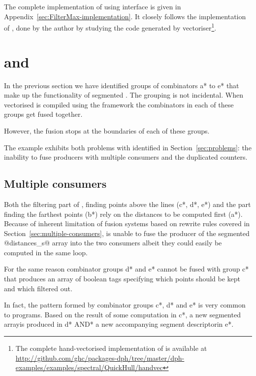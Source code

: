 \documentclass[preamble.tex]{subfiles}
\begin{document}
The complete implementation of  using \LiveFusion interface is given in Appendix~\ref{sec:FilterMax-implementation}. It closely follows the implementation of \QuickHull, done by the author by studying the  code generated by \DPH vectoriser\footnote{The complete hand-vectorised implementation of \QuickHull is available at \url{http://github.com/ghc/packages-dph/tree/master/dph-examples/examples/spectral/QuickHull/handvec}}.



\section{\StreamFusion and \FilterMax}

In the previous section we have identified groups of combinators \*a* to \*e* that make up the functionality of segmented \FilterMax. The grouping is not incidental. When vectorised \QuickHull is compiled using the \StreamFusion framework the combinators in each of these groups get fused together.

However, the fusion stops at the boundaries of each of these groups.

The \FilterMax example exhibits both problems with \StreamFusion identified in Section~\ref{sec:problems}: the inability to fuse producers with multiple consumers and the duplicated counters.


\subsection{Multiple consumers}

Both the filtering part of \FilterMax, finding points above the lines (\*c*, \*d*, \*e*) and the part finding the farthest points (\*b*) rely on the distances to be computed first (\*a*). Because of inherent limitation of fusion systems based on rewrite rules covered in Section~\ref{sec:multiple-consumers}, \StreamFusion is unable to fuse the producer of the segmented @distances_s@ array into the two consumers albeit they could easily be computed in the same loop.

For the same reason combinator groups \*d* and \*e* cannot be fused with group \*c* that produces an array of boolean tags specifying which points should be kept and which filtered out.

\begin{bluebox}
In fact, the pattern formed by combinator groups \*c*, \*d* and \*e* is very common to \DPH programs. Based on the result of some computation in \*c*, a new segmented array\isegarray is produced in \*d* \*AND* a new accompanying segment descriptor\isegd in \*e*.
\end{bluebox}
\end{document}
